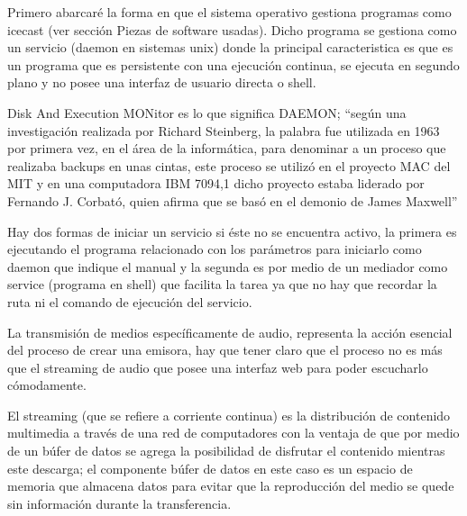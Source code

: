 \begin{multicols}{2}

Primero abarcaré la forma en que el sistema operativo gestiona programas como icecast (ver sección Piezas de software usadas). Dicho programa se gestiona como un servicio (daemon en sistemas unix) donde la principal caracteristica es que es un programa que es persistente con una ejecución continua, se ejecuta en segundo plano y no posee una interfaz de usuario directa o shell.

Disk And Execution MONitor es lo que significa DAEMON; ``según una investigación realizada por Richard Steinberg, la palabra fue utilizada en 1963 por primera vez, en el área de la informática, para denominar a un proceso que realizaba backups en unas cintas, este proceso se utilizó en el proyecto MAC del MIT y en una computadora IBM 7094,1 dicho proyecto estaba liderado por Fernando J. Corbató, quien afirma que se basó en el demonio de James Maxwell''\cite {ref1}

Hay dos formas de iniciar un servicio si éste no se encuentra activo, la primera es ejecutando el programa relacionado con los parámetros para iniciarlo como daemon que indique el manual y la segunda es por medio de un mediador como service (programa en shell) que facilita la tarea ya que no hay que recordar la ruta ni el comando de ejecución del servicio.


La transmisión de medios específicamente de audio, representa la acción esencial del proceso de crear una emisora, hay que tener claro que el proceso no es más que el streaming de audio que posee una interfaz web para poder escucharlo cómodamente.

\begin{center}
\end{center}

El streaming (que se refiere a corriente continua) es la distribución de contenido multimedia a través de una red de computadores con la ventaja de que por medio de un búfer de datos se agrega la posibilidad de disfrutar el contenido mientras este descarga; el componente búfer de datos en este caso es un espacio de memoria que almacena datos para evitar que la reproducción del medio se quede sin información durante la transferencia.


\end{multicols}
